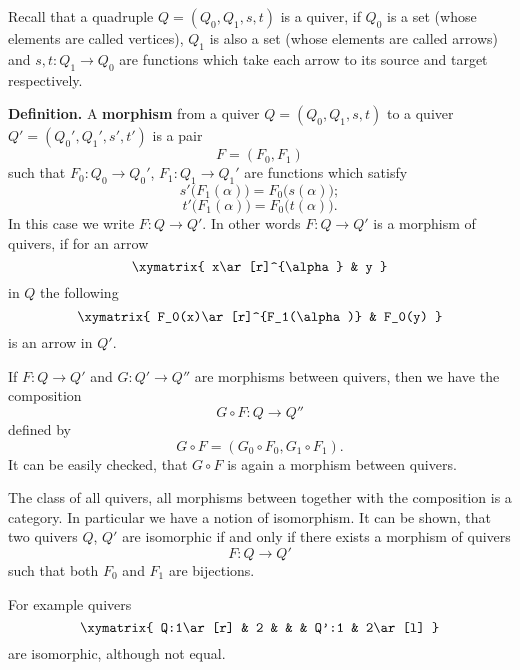 \documentclass[12pt]{article}
\begin{document}
Recall that a quadruple $Q=(Q_0,Q_1,s,t)$ is a quiver, if $Q_0$ is a set (whose elements are called vertices), $Q_1$ is also a set (whose elements are called arrows) and $s,t:Q_1\to Q_0$ are functions which take each arrow to its source and target respectively.

\textbf{Definition.} A \textbf{morphism} from a quiver $Q=(Q_0,Q_1,s,t)$ to a quiver $Q'=(Q_0',Q_1',s',t')$ is a pair
$$F=(F_0,F_1)$$
such that $F_0:Q_0\to Q_0'$, $F_1:Q_1\to Q_1'$ are functions which satisfy
$$s'\big(F_1(\alpha)\big)=F_0\big(s(\alpha)\big);$$
$$t'\big(F_1(\alpha)\big)=F_0\big(t(\alpha)\big).$$
In this case we write $F:Q\to Q'$. In other words $F:Q\to Q'$ is a morphism of quivers, if for an arrow
$$\xymatrix{
x\ar[r]^{\alpha} & y
}$$
in $Q$ the following
$$\xymatrix{
F_0(x)\ar[r]^{F_1(\alpha)} & F_0(y)
}$$
is an arrow in $Q'$.

If $F:Q\to Q'$ and $G:Q'\to Q''$ are morphisms between quivers, then we have the composition
$$G\circ F:Q\to Q''$$
defined by
$$G\circ F=(G_0\circ F_0, G_1\circ F_1).$$
It can be easily checked, that $G\circ F$ is again a morphism between quivers.

The class of all quivers, all morphisms between together with the composition is a category. In particular we have a notion of isomorphism. It can be shown, that two quivers $Q$, $Q'$ are isomorphic if and only if there exists a morphism of quivers
$$F:Q\to Q'$$
such that both $F_0$ and $F_1$ are bijections.

For example quivers
$$\xymatrix{
Q:1\ar[r] & 2 & & & Q':1 & 2\ar[l]
}$$
are isomorphic, although not equal.
\end{document}
